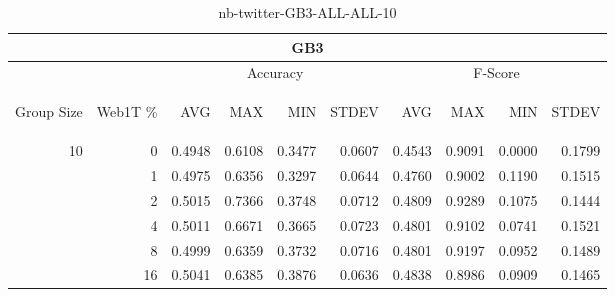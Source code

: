 \begin{center}
\begin{table}[htbp]
\begin{tabular}{ | r | r | r | r | r | r | r | r | r | r |}
\hline
\multicolumn{10}{|c|}{GB3}\\
\hline
 & & \multicolumn{4}{|c|}{Accuracy} & \multicolumn{4}{|c|}{F-Score}\\ \cline{3-10}
\begin{sideways}Group Size\end{sideways} & \begin{sideways}Web1T \%\end{sideways} & \begin{sideways}AVG\end{sideways} & \begin{sideways}MAX\end{sideways} & \begin{sideways}MIN\end{sideways} & \begin{sideways}STDEV\end{sideways} & \begin{sideways}AVG\end{sideways} & \begin{sideways}MAX\end{sideways} & \begin{sideways}MIN\end{sideways} & \begin{sideways}STDEV\end{sideways}\\
\hline
\multirow{5}{*}{10}
 & 0 & 0.4948 & 0.6108 & 0.3477 & 0.0607 & 0.4543 & 0.9091 & 0.0000 & 0.1799\\ \cline{2-10}
 & 1 & 0.4975 & 0.6356 & 0.3297 & 0.0644 & 0.4760 & 0.9002 & 0.1190 & 0.1515\\ \cline{2-10}
 & 2 & 0.5015 & 0.7366 & 0.3748 & 0.0712 & 0.4809 & 0.9289 & 0.1075 & 0.1444\\ \cline{2-10}
 & 4 & 0.5011 & 0.6671 & 0.3665 & 0.0723 & 0.4801 & 0.9102 & 0.0741 & 0.1521\\ \cline{2-10}
 & 8 & 0.4999 & 0.6359 & 0.3732 & 0.0716 & 0.4801 & 0.9197 & 0.0952 & 0.1489\\ \cline{2-10}
 & 16 & 0.5041 & 0.6385 & 0.3876 & 0.0636 & 0.4838 & 0.8986 & 0.0909 & 0.1465\\ \cline{2-10}
\hline
\end{tabular}
\caption{nb-twitter-GB3-ALL-ALL-10}
\label{table:nb-twitter-GB3-ALL-ALL-10}
\end{table}
\end{center}

